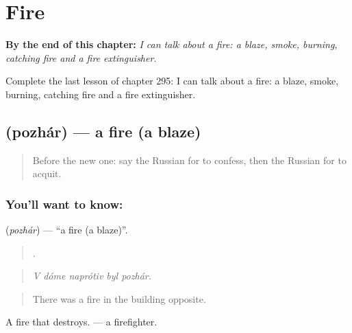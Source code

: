 
\chapter{Fire}
\label{ch:ru-fire}

\begin{chapteropening}
\textbf{By the end of this chapter:} \emph{I can talk about a fire: a blaze, smoke, burning, catching fire and a fire extinguisher.}

Complete the last lesson of chapter 295: I can talk about a fire: a blaze, smoke, burning, catching fire and a fire extinguisher.
\end{chapteropening}

\section[\texorpdfstring{\ru{пожар} (pozhár)}{пожар (pozhár)}]{ (pozhár) — a fire (a blaze)}

\label{lesson:RU-C295-pozhar}



\begin{quote}
Before the new one: say the Russian for to confess, then the Russian for to acquit.
\end{quote}

\subsection*{You'll want to know: }
\textbf{} (\emph{pozhár}) — \textquotedblleft{}a fire (a blaze)\textquotedblright{}.

\begin{quote}
    .
\end{quote}

\begin{quote}
\emph{V dóme naprótiv byl pozhár.}
\end{quote}

\begin{quote}
There was a fire in the building opposite.
\end{quote}

A fire that destroys. \emph{} — a firefighter.

